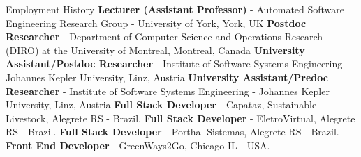 \begin{rubric}{Employment History}
\entry*[2026 -- $\cdots$]%
	\textbf{Lecturer (Assistant Professor)} - Automated Software Engineering Research Group - University of York, York, UK
\entry*[2025 -- 2026]%
	\textbf{Postdoc Researcher} - Department of Computer Science and Operations Research (DIRO) at the University of Montreal, Montreal, Canada
\entry*[2023 -- 2025]%
	\textbf{University Assistant/Postdoc Researcher} - Institute of Software Systems Engineering - Johannes Kepler University, Linz, Austria
 \entry*[2020 -- 2023]%
	\textbf{University Assistant/Predoc Researcher} - Institute of Software Systems Engineering - Johannes Kepler University, Linz, Austria
%
%
\entry*[2019 -- 2020]%
	\textbf{Full Stack Developer} - Capataz,  Sustainable Livestock, Alegrete RS - Brazil.
\entry*[2019 -- 2020]%
	\textbf{Full Stack Developer} - EletroVirtual, Alegrete RS - Brazil.
\entry*[2017 -- 2017]%
	\textbf{Full Stack Developer} - Porthal Sistemas, Alegrete RS - Brazil.
\entry*[2014 -- 2014]%
	\textbf{Front End Developer} - GreenWays2Go, Chicago IL - USA.
\end{rubric}